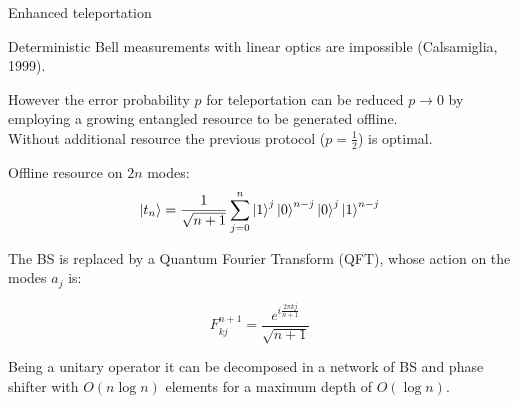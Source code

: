 \documentclass{beamer}
\begin{document}
\begin{frame}{Enhanced teleportation}
\begin{center}
\begin{block}{}
\begin{center}
Deterministic Bell measurements with linear optics are impossible (Calsamiglia, 1999).
\end{center}
\end{block}
\vspace{15pt}
However the error probability $p$ for teleportation can be reduced $p \rightarrow 0$ by employing a growing entangled resource to be generated offline.\\
\vspace{10pt}
Without additional resource the previous protocol ($p = \frac{1}{2}$) is optimal.

\end{center}
\end{frame}

\begin{frame}
\begin{center}

Offline resource on $2n$ modes:
\begin{equation*}
\ket{t_n} = \frac{1}{\sqrt{n+1}} \sum_{j = 0}^{n} \ket{1}^{j} \ket{0}^{n-j} \ket{0}^{j} \ket{1}^{n-j}
\end{equation*}

The BS is replaced by a Quantum Fourier Transform (QFT), whose action on the modes $a_j$ is:

\begin{equation*}
F^{n+1}_{kj} = \frac{e^{i \frac {2 \pi k j}{n+1}}}{\sqrt{n+1}}
\end{equation*}

Being a unitary operator it can be decomposed in a network of BS and phase shifter with $O \left( n \log n \right)$ elements for a maximum depth of $O \left( \log n \right)$.

\end{center}
\end{frame}
\end{document}
